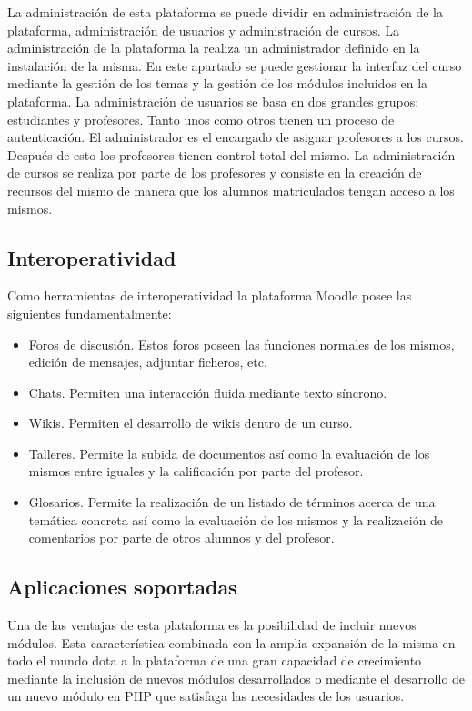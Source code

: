 La administración de esta plataforma se puede dividir en administración de la plataforma, administración de usuarios y administración de cursos. La administración de la plataforma la realiza un administrador definido en la instalación de la misma. En este apartado se puede gestionar la interfaz del curso mediante la gestión de los temas y la gestión de los módulos incluidos en la plataforma. La administración de usuarios se basa en dos grandes grupos: estudiantes y profesores. Tanto unos como otros tienen un proceso de autenticación. El administrador es el encargado de asignar profesores a los cursos. Después de esto los profesores tienen control total del mismo. La administración de cursos se realiza por parte de los profesores y consiste en la creación de recursos del mismo de manera que los alumnos matriculados tengan acceso a los mismos.

\subsection{Interoperatividad}

Como herramientas de interoperatividad la plataforma Moodle posee las siguientes fundamentalmente:

\begin{itemize}
	\item Foros de discusión. Estos foros poseen las funciones normales de los mismos, edición de mensajes, adjuntar ficheros, etc.
	\item Chats. Permiten una interacción fluida mediante texto síncrono.
	\item Wikis. Permiten el desarrollo de wikis dentro de un curso.
	\item Talleres. Permite la subida de documentos así como la evaluación de los mismos entre iguales y la calificación por parte del profesor.
	\item Glosarios. Permite la realización de un listado de términos acerca de una temática concreta así como la evaluación de los mismos y la realización de comentarios por parte de otros alumnos y del profesor.
\end{itemize}

\subsection{Aplicaciones soportadas}

Una de las ventajas de esta plataforma es la posibilidad de incluir nuevos módulos. Esta característica combinada con la amplia expansión de la misma en todo el mundo dota a la plataforma de una gran capacidad de crecimiento mediante la inclusión de nuevos módulos desarrollados o mediante el desarrollo de un nuevo módulo en PHP que satisfaga las necesidades de los usuarios.

